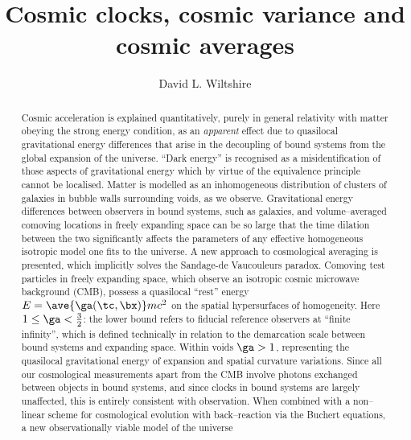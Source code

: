 \documentclass[12pt]{iopart}
\begin{document}
\title{Cosmic clocks, cosmic variance and cosmic averages}
\author{David L. Wiltshire}
\address{Department of Physics and Astronomy, University of Canterbury,
Private Bag 4800, Christchurch 8140, New Zealand}

\begin{abstract}
Cosmic acceleration is explained quantitatively, purely in
general relativity with matter obeying the strong energy condition, as an
{\em apparent} effect due to quasilocal gravitational energy differences
that arise in the decoupling of bound systems from the global expansion of
the universe. ``Dark energy'' is recognised as a misidentification of those
aspects of gravitational energy which by virtue of the equivalence principle
cannot be localised. Matter is modelled as an
inhomogeneous distribution of clusters of galaxies in bubble walls
surrounding voids, as we observe. Gravitational energy differences between
observers in bound systems, such as galaxies, and volume--averaged comoving
locations in freely expanding space can be so large that the time dilation
between the two significantly affects the parameters of any effective
homogeneous isotropic model one fits to the universe. A new approach to
cosmological averaging is presented, which implicitly solves the Sandage-de
Vaucouleurs paradox. Comoving
test particles in freely expanding space, which observe an isotropic cosmic
microwave background (CMB), possess a quasilocal ``rest'' energy
$E=\ave{\ga(\tc,\bx)} m c^2$ on the spatial hypersurfaces of
homogeneity. Here $1\le\ga<\frac32$: the lower bound refers to fiducial
reference observers at ``finite infinity'', which is defined technically in
relation to the demarcation scale between bound systems and expanding space.
Within voids $\ga>1$, representing the quasilocal gravitational energy of
expansion and spatial curvature variations. Since all our cosmological
measurements apart from the CMB involve photons exchanged between objects
in bound systems, and since clocks in bound systems are largely unaffected,
this is entirely consistent with observation. When combined with a non--linear
scheme for cosmological evolution with back--reaction via the
Buchert equations, a new observationally viable model of the universe

\end{abstract}
\end{document}
